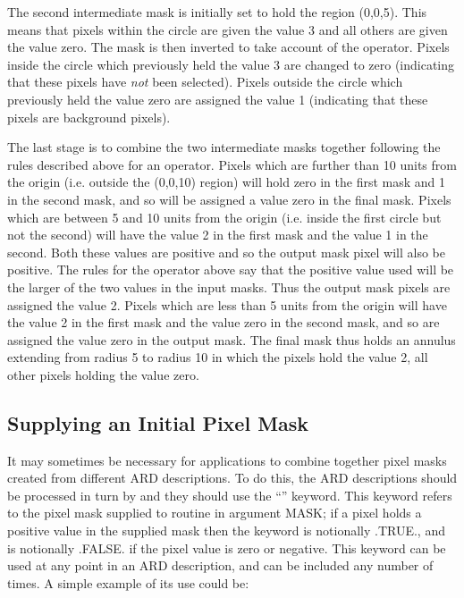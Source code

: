 \documentclass[11pt]{starlink}
\begin{document}
The second intermediate mask is initially set to hold the region (0,0,5).
This means that pixels within the circle are given the value 3 and all others
are given the value zero. The mask is then inverted to take account of the 
operator. Pixels inside the circle which previously held the value 3 are changed
to zero (indicating that these pixels have \emph{not} been selected). Pixels
outside the circle which previously held the value zero are assigned the value 1
(indicating that these pixels are background pixels).

The last stage is to combine the two intermediate masks together following the
rules described above for an  operator. Pixels which are further than 10
units from the origin (i.e. outside the (0,0,10) region) will hold zero in
the first mask and 1 in the second mask, and so will be assigned a
value zero in the final mask. Pixels which are between 5 and 10 units from the
origin (i.e. inside the first circle but not the second) will have the value 2
in the first mask and the value 1 in the second. Both these values are
positive and so the output mask pixel will also be positive. The rules for the
 operator above say that the positive value used will be the larger of the
two values in the input masks. Thus the output mask pixels are assigned the
value 2. Pixels which are less than 5 units from the origin will have the value
2 in the first mask and the value zero in the second mask, and so are assigned
the value zero in the output mask. The final mask thus holds an annulus
extending from radius 5 to radius 10 in which the pixels hold the value 2, all
other pixels holding the value zero.

\subsection{\label{SEC:MASK}Supplying an Initial Pixel Mask}
It may sometimes be necessary for applications to combine together pixel masks
created from different ARD descriptions. To do this, the ARD descriptions should
be processed in turn by  and they should use the ``'' keyword.
This keyword refers to the pixel mask supplied to routine  in argument
MASK; if a pixel holds a positive value in the supplied mask then the 
keyword is notionally .TRUE., and is notionally .FALSE. if the pixel value is
zero or negative. This keyword can be used at any point in an ARD description,
and can be included any number of times. A simple example of its use could be:
\end{document}
